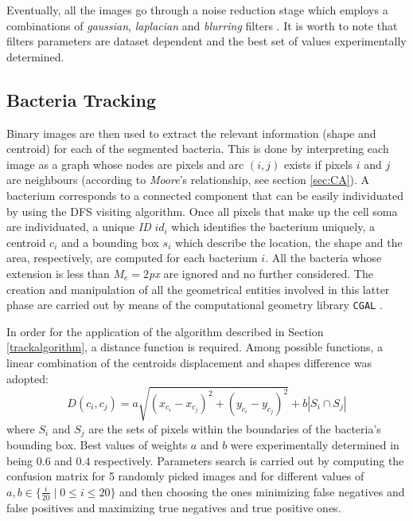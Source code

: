 \documentclass[conference]{IEEEtran}
\begin{document}
Eventually, all the images go through a noise reduction stage which employs a combinations of \textit{gaussian}, \textit{laplacian} and \textit{blurring} filters \cite{Deng:1993}.
It is worth to note that filters parameters are dataset dependent and the best set of values experimentally determined. 





\subsection{Bacteria Tracking}

Binary images are then used to extract the relevant information (shape and centroid) for each of the segmented bacteria.
This is done by interpreting each image as a graph whose nodes are pixels and arc $(i,j)$ exists if pixels $i$ and $j$ are neighbours (according to \textit{Moore}'s relationship, see section \ref{sec:CA}).
A bacterium corresponds to a connected component that can be easily individuated by using the DFS visiting algorithm.
Once all pixels that make up the cell soma are individuated, a unique \textit{ID} $id_i$ which identifies the bacterium uniquely, a centroid $c_i$ and a bounding box $s_i$ which describe the location, the shape and the area, respectively, are computed for each bacterium $i$. All the bacteria whose extension is less than $M_e = 2$\textit{px} are ignored and no further considered.
The creation and manipulation of all the geometrical entities involved in this latter phase are carried out by means of the computational geometry library \texttt{CGAL}  \cite{CGAL}.

In order for the application of the algorithm described in Section \ref{trackalgorithm}, a distance function is required.
Among possible functions, a linear combination of the centroids displacement and shapes difference was adopted:
\begin{equation}
\label{sec:bacttracking}
D(c_i,c_j) = a \sqrt{(x_{c_i} - x_{c_j})^2 + (y_{c_i}-y_{c_j})^2} + b |S_i \cap S_j|
\end{equation}
where $S_i$ and $S_j$ are the sets of pixels within the boundaries of the bacteria's  bounding box. Best values of weights $a$ and $b$ were experimentally determined in being $0.6$ and $0.4$ respectively. 
Parameters search is carried out by computing the confusion matrix for 5 randomly picked images and for different values of $a,b \in \{\frac{i}{20}\;|\;0\leq i \leq 20\}$ and then choosing the ones minimizing false negatives and false positives and maximizing true negatives and true positive ones. 
\end{document}
